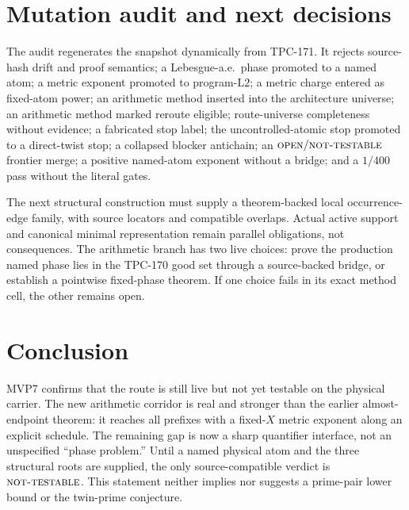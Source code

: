 \documentclass[11pt]{article}
\theoremstyle{definition}
\theoremstyle{remark}
\newcommand{\NT}{\textnormal{\textsc{not-testable}}}
\newcommand{\OPEN}{\textnormal{\textsc{open}}}
\newcommand{\Ltwo}{\mathrm{L2}}
\begin{document}
\section{Mutation audit and next decisions}

The audit regenerates the snapshot dynamically from TPC-171.  It
rejects source-hash drift and proof semantics; a Lebesgue-a.e.\ phase
promoted to a named atom; a metric exponent promoted to
program-\(\Ltwo\); a metric charge entered as fixed-atom power; an
arithmetic method inserted into the architecture universe; an
arithmetic method marked reroute eligible; route-universe completeness
without evidence; a fabricated stop label; the uncontrolled-atomic
stop promoted to a direct-twist stop; a collapsed blocker antichain;
an \(\OPEN/\NT\) frontier merge; a positive named-atom exponent
without a bridge; and a \(1/400\) pass without the literal gates.

The next structural construction must supply a theorem-backed local
occurrence-edge family, with source locators and compatible overlaps.
Actual active support and canonical minimal representation remain
parallel obligations, not consequences.  The arithmetic branch has
two live choices: prove the production named phase lies in the
TPC-170 good set through a source-backed bridge, or establish a
pointwise fixed-phase theorem.  If one choice fails in its exact
method cell, the other remains open.

\section{Conclusion}

MVP7 confirms that the route is still live but not yet testable on the
physical carrier.  The new arithmetic corridor is real and stronger
than the earlier almost-endpoint theorem: it reaches all prefixes
with a fixed-\(X\) metric exponent along an explicit schedule.  The
remaining gap is now a sharp quantifier interface, not an unspecified
``phase problem.''  Until a named physical atom and the three
structural roots are supplied, the only source-compatible verdict is
\(\NT\).  This statement neither implies nor suggests a prime-pair
lower bound or the twin-prime conjecture.

\nocite{*}


\end{document}
